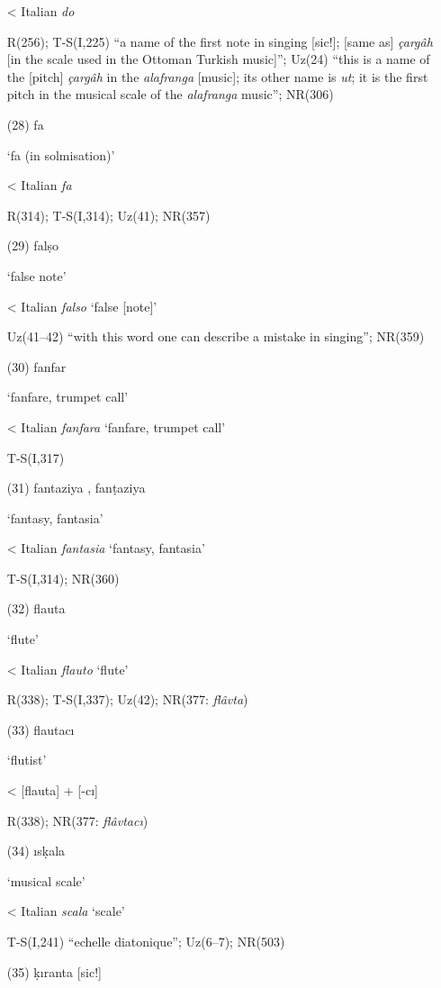 \documentclass[output=paper,colorlinks,citecolor=brown,arabicfont,chinesefont]{langscibook}
\begin{document}
\begin{itemize}
    < Italian \emph{do}

    R(256); T-S(I,225) “a name of the first note in singing [sic!]; [same as] \emph{çargâh} [in the scale used in the Ottoman Turkish music]”; Uz(24) “this is a name of the [pitch] \emph{çargâh} in the \emph{alafranga} [music]; its other name is \emph{ut}; it is the first pitch in the musical scale of the \emph{alafranga} music”; NR(306)
    \item[(28)] fa {}

    ‘fa (in solmisation)’ 

    < Italian \emph{fa}

    R(314); T-S(I,314); Uz(41); NR(357)
    \item[(29)] falṣo {}

    ‘false note’

    < Italian \emph{falso} ‘false [note]’

    Uz(41--42) “with this word one can describe a mistake in singing”; NR(359)
    \item[(30)] fanfar {}

    ‘fanfare, trumpet call’

    < Italian \emph{fanfara} ‘fanfare, trumpet call’

    T-S(I,317)
    \item[(31)] fantaziya {} , fanṭaziya {}

    ‘fantasy, fantasia’

    	< Italian \emph{fantasia} ‘fantasy, fantasia’

     T-S(I,314); NR(360)
    \item[(32)] flauta {}

    ‘flute’

    < Italian \emph{flauto} ‘flute’

    R(338); T-S(I,337); Uz(42); NR(377: \emph{flâvta})
    \item[(33)] flautacı {}

    ‘flutist’

    < {} [flauta] + {} [-cı]

    R(338); NR(377: \emph{flâvtacı})
    \item[(34)] ısḳala {}

    ‘musical scale’

    < Italian \emph{scala} ‘scale’

\largerpage
    T-S(I,241) “echelle diatonique”; Uz(6--7); NR(503)
    \item[(35)] ḳıranta {}  [sic!]


\end{itemize}
\end{document}
